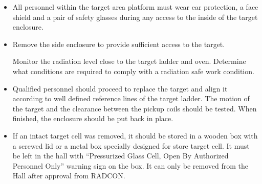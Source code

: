 {\begin{itemize}
\item 
\begin{safetyen}{10}{5}
All personnel within the target area platform must wear ear
protection, a face shield and a pair of safety glasses 
during any access to the inside of the target enclosure.
\end{safetyen}
\item  
Remove the side enclosure to provide sufficient
access to the target.  
\begin{safetyen}{10}{5}
Monitor the radiation level close to the target
ladder and oven.  Determine what conditions are required to comply
with a radiation safe work condition.
\end{safetyen}

\item 
Qualified personnel should proceed to replace the target and align it
according to well defined reference lines of the target ladder. The
motion of the target and the clearance between the pickup
coils should be tested. When finished,
the enclosure should be put back in place. 

\item 
\begin{safetyen}{10}{5}
If an intact target cell was removed, it should be stored in a wooden
box with a screwed lid or a metal box specially designed for store
target cell. It must be left in the hall with 
``Pressurized Glass Cell, Open By Authorized Personnel Only'' warning sign 
on the box. It can only be
removed from the Hall after approval from RADCON.
\end{safetyen}

\end{itemize}

} %
